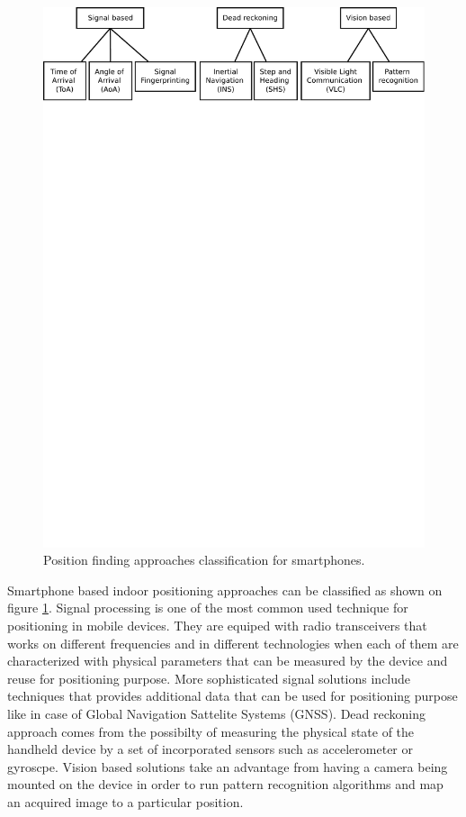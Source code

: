 \documentclass[../main.tex]{subfiles}
\begin{document}
\begin{figure}[!htbp]
\includegraphics[width=\textwidth, trim={0 23cm 0 0},clip]{pictures/smartphone_localization_approaches.pdf}
\centering
\caption{Position finding approaches classification for smartphones.\cite{inertial_navi_velocity_model}}
\label{fig:smartphone_localization_approaches}
\end{figure}

Smartphone based indoor positioning approaches can be classified as shown on figure \ref{fig:smartphone_localization_approaches}. Signal processing is one of the most common used technique for positioning in mobile devices. They are equiped with radio transceivers that works on different frequencies and in different technologies when each of them are characterized with physical parameters that can be measured by the device and reuse for positioning purpose. More sophisticated signal solutions include techniques that provides additional data that can be used for positioning purpose like in case of Global Navigation Sattelite Systems (GNSS)\cite{GPS_retransmission_differential}. Dead reckoning approach comes from the possibilty of measuring the physical state of the handheld device by a set of incorporated sensors such as accelerometer or gyroscpe. Vision based solutions take an advantage from having a camera being mounted on the device in order to run pattern recognition algorithms and map an acquired image to a particular position.
\end{document}
